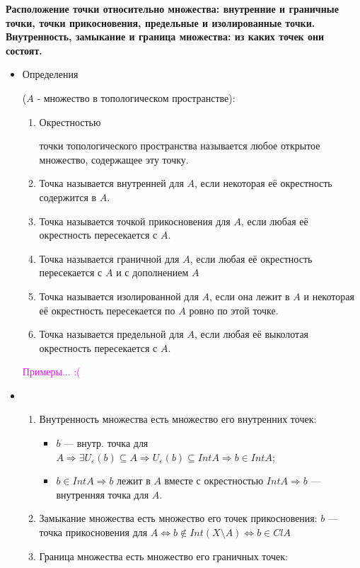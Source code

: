 \documentclass[a4paper,100pt]{article}
\theoremstyle{indented}
\begin{document}
\medskip

\textbf{ Расположение точки относительно множества: внутренние и граничные точки, точки прикосновения, предельные и изолированные точки. Внутренность, замыкание и граница множества: из каких точек они состоят.}
\begin{itemize}
    \item \hypertarget{n10}{Определения}($A$ - множество в топологическом пространстве):
    \begin{enumerate}
        \item \hypertarget{n11}{Окрестностью} точки топологического пространства называется любое открытое множество, содержащее эту точку.
        \item Точка называется внутренней для $A$, если некоторая её окрестность содержится в $A$.
        \item Точка называется точкой прикосновения для $A$, если любая её окрестность пересекается с $A$.
        \item Точка называется граничной для $A$, если любая её окрестность пересекается с $A$ и с дополнением $A$
        \item Точка называется изолированной для $A$, если она лежит в $A$ и некоторая её окрестность пересекается по $A$ ровно по этой точке.
        \item Точка называется предельной для $A$, если любая её выколотая окрестность пересекается с $A$.
    \end{enumerate}
    \textcolor{magenta}{Примеры... :(}
    
    \item 
    \begin{enumerate}
        \item Внутренность множества есть множество его внутренних точек:
            \begin{itemize}
                \item $b$ --- внутр. точка для $A \Rightarrow \exists U_\varepsilon(b) \subseteq A \Rightarrow U_\varepsilon(b) \subseteq Int A  \Rightarrow b \in IntA$;
                \item $b \in Int A \Rightarrow b \text{ лежит в $A$ вместе с окрестностью } IntA \Rightarrow b$ --- внутренняя точка для $A$. 
            \end{itemize}
        \item Замыкание множества есть множество его точек прикосновения:
                $b$ --- точка прикосновения для $A \iff b \notin Int(X \setminus A) \iff b \in ClA$
        \item Граница множества есть множество его граничных точек:
        

\end{enumerate}
\end{itemize}
\end{document}

